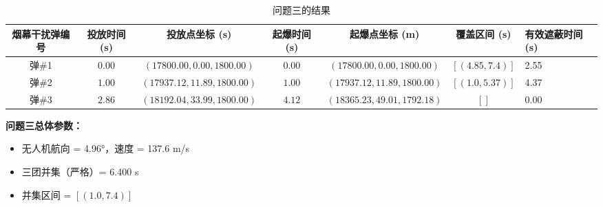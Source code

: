 \documentclass[withoutpreface,bwprint]{cumcmthesis} %
\begin{document}
\begin{table}[h]
    \centering
    \caption{问题三的结果}
    \label{tab:problem3_result}
    \begin{tabular}{|c|c|c|c|c|c|}
        \toprule[1.5pt]
        烟幕干扰弹编号 & 投放时间 (s) & 投放点坐标 (s) & 起爆时间 (s) & 起爆点坐标 (m) & 覆盖区间 (s) & 有效遮蔽时间 (s) \\
        \midrule[1pt]
        弹\#1 & $0.00$ & $(17800.00, 0.00, 1800.00)$ & $0.00$ & $(17800.00, 0.00, 1800.00)$ & $[(4.85, 7.4)]$ & 2.55 \\
        弹\#2 & $1.00$ & $(17937.12, 11.89, 1800.00)$ & $1.00$ & $(17937.12, 11.89, 1800.00)$ & $[(1.0, 5.37)]$ & 4.37 \\
        弹\#3 & $2.86$ & $(18192.04, 33.99, 1800.00)$ & $4.12$ & $(18365.23, 49.01, 1792.18)$ & $[]$ & 0.00 \\
        \bottomrule[1.5pt]
    \end{tabular}
\end{table}

\textbf{问题三总体参数：}
\begin{itemize}
    \item 无人机航向 = 4.96°，速度 = 137.6 m/s
    \item 三团并集（严格）= 6.400 s
    \item 并集区间 = $[(1.0, 7.4)]$  
\end{itemize}
\end{document}
